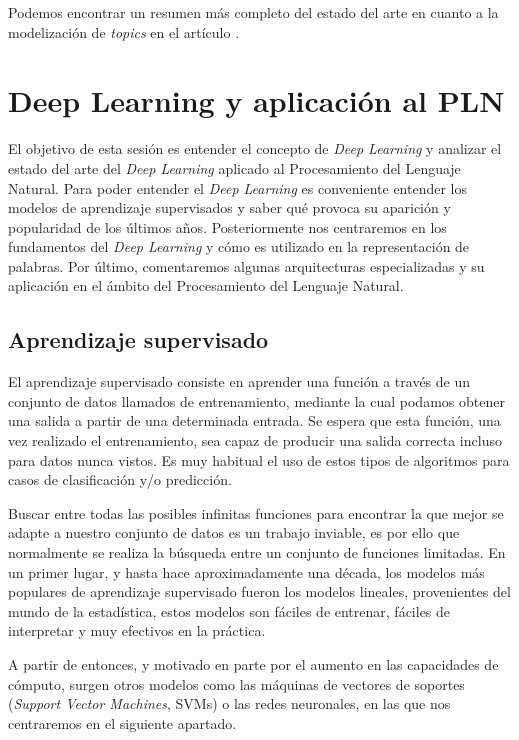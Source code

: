 Podemos encontrar un resumen más completo del estado del arte en cuanto a la modelización de \textit{topics} en el artículo \cite{Mahmood2013LiteratureSO}. 

\section{Deep Learning  y aplicación al PLN}
\label{section:arte:deep}

El objetivo de esta sesión es entender el concepto de \textit{Deep Learning} y analizar el estado del arte del \textit{Deep Learning} aplicado al Procesamiento del Lenguaje Natural. Para poder entender el \textit{Deep Learning} es conveniente entender los modelos de aprendizaje supervisados y saber qué provoca su aparición y popularidad de los últimos años. Posteriormente nos centraremos en los fundamentos del \textit{Deep Learning} y cómo es utilizado en la representación de palabras. Por último, comentaremos algunas arquitecturas especializadas y su aplicación en el ámbito del Procesamiento del Lenguaje Natural.


\subsection{Aprendizaje supervisado}
El aprendizaje supervisado consiste en aprender una función a través de un conjunto de datos llamados de entrenamiento, mediante la cual podamos obtener una salida a partir de una determinada entrada. Se espera que esta función, una vez realizado el entrenamiento, sea capaz de producir una salida correcta incluso para datos nunca vistos. Es muy habitual el uso de estos tipos de algoritmos para casos de clasificación y/o predicción. 

Buscar entre todas las posibles infinitas funciones para encontrar la que mejor se adapte a nuestro conjunto de datos es un trabajo inviable, es por ello que normalmente se realiza la búsqueda entre un conjunto de funciones limitadas. En un primer lugar, y hasta hace aproximadamente una década, los modelos más populares de aprendizaje supervisado fueron los modelos lineales, provenientes del mundo de la estadística, estos modelos son fáciles de entrenar, fáciles de interpretar y muy efectivos en la práctica. 

A partir de entonces, y motivado en parte por el aumento en las capacidades de cómputo, surgen otros modelos como las máquinas de vectores de soportes (\textit{Support Vector Machines}, SVMs) o las redes neuronales, en las que nos centraremos en el siguiente apartado.


